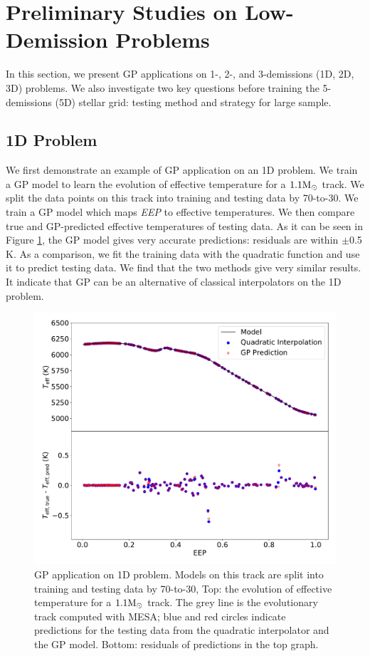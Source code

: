\section{Preliminary Studies on Low-Demission Problems}\label{examples}

In this section, we present GP applications on 1-, 2-, and 3-demissions (1D, 2D, 3D) problems. We also investigate two key questions before training the 5-demissions (5D) stellar grid: testing method and strategy for large sample. 

\subsection{1D Problem}

We first demonstrate an example of GP application on an 1D problem. We train a GP model to learn the evolution of effective temperature for a $\rm 1.1M_{\odot}$ track. We split the data points on this track into training and testing data by 70-to-30. We train a GP model which maps  {\it EEP} to effective temperatures. We then compare true and GP-predicted effective temperatures of testing data. As it can be seen in Figure \ref{fig:1dgp},  the GP model gives very accurate predictions: residuals are within $\pm$0.5 K. As a comparison, we fit the training data with the quadratic function and use it to predict testing data. We find that the two methods give very similar results. It indicate that GP can be an alternative of classical interpolators on the 1D problem. 

\begin{figure}
	\includegraphics[width=1.0\columnwidth]{1d-gp.pdf}
    \caption{GP application on 1D problem. Models on this track are split into training and testing data by 70-to-30, Top: the evolution of effective temperature for a $\rm 1.1M_{\odot}$ track. The grey line is the evolutionary track computed with \textsc{MESA}; blue and red circles indicate predictions for the testing data from the quadratic interpolator and the GP model. Bottom: residuals of predictions in the top graph. }  
    \label{fig:1dgp}
\end{figure}

